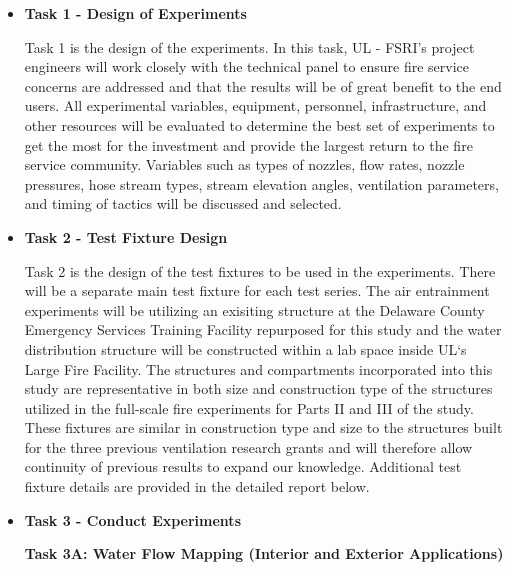\documentclass{article}
\begin{document}
\begin{itemize}

\item \bf{Task 1 - Design of Experiments}
\normalfont
\vspace*{\baselineskip}

Task 1 is the design of the experiments. In this task, UL - FSRI's project engineers will work closely with the technical panel to ensure fire service concerns are addressed and that the results will be of great benefit to the end users. All experimental variables, equipment, personnel, infrastructure, and other resources will be evaluated to determine the best set of experiments to get the most for the investment and provide the largest return to the fire service community. Variables such as types of nozzles, flow rates, nozzle pressures, hose stream types, stream elevation angles, ventilation parameters, and timing of tactics will be discussed and selected.  
\vspace*{\baselineskip}

\item \bf{Task 2 - Test Fixture Design}
\normalfont
\vspace*{\baselineskip}

Task 2 is the design of the test fixtures to be used in the experiments. There will be a separate main test fixture for each test series. The air entrainment experiments will be utilizing an exisiting structure at the Delaware County Emergency Services Training Facility repurposed for this study and the water distribution structure will be constructed within a lab space inside UL`s Large Fire Facility. The structures and compartments incorporated into this study are representative in both size and construction type of the structures utilized in the full-scale fire experiments for Parts II and III of the study. These fixtures are similar in construction type and size to the structures built for the three previous ventilation research grants and will therefore allow continuity of previous results to expand our knowledge. Additional test fixture details are provided in the detailed report below.
\vspace*{\baselineskip}

\item \bf{Task 3 - Conduct Experiments}
\normalfont
\vspace*{\baselineskip}

\subitem \bf{Task 3A:  Water Flow Mapping (Interior and Exterior Applications)}
\normalfont
\vspace*{\baselineskip} 


\end{itemize}
\end{document}
